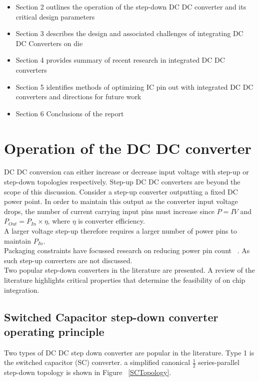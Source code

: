 \documentclass[letterpaper,twocolumn,10pt]{article}
\begin{document}
\begin{itemize}
\item{Section 2 outlines the operation of the step-down DC DC converter and its critical design parameters}
\item{Section 3 describes the design and associated challenges of integrating DC DC Converters on die}
\item{Section 4 provides summary of recent research in integrated DC DC converters}
\item{Section 5 identifies methods of optimizing IC pin out with integrated DC DC converters and directions for future work}
\item{Section 6 Conclusions of the report}
\end{itemize}
 


\section{Operation of the DC DC converter}

DC DC conversion can either increase or decrease input voltage with step-up or step-down topologies respectively. Step-up DC DC converters are beyond the scope of this discussion. Consider a step-up converter outputting a fixed DC power point. In order to maintain this output as the converter input voltage drops, the number of current carrying input pins must increase since $P = IV$ and $P_{Out} = P_{In}\times \eta$, where $\eta$ is converter efficiency.\\
A larger voltage step-up therefore requires a larger number of power pins to maintain $P_{In}$.\\ Packaging constraints have focussed research on reducing power pin count ~\cite{Marbell2011}. As such step-up converters are not discussed.\\
\indent Two popular step-down converters in the literature are presented. A review of the literature highlights critical properties that determine the feasibility of on chip integration.

\subsection{Switched Capacitor step-down converter operating principle}\label{SCOpPrinciple}
Two types of DC DC step down converter are popular in the literature. Type 1 is the switched capacitor (SC) converter. a simplified canonical $\frac{1}{2}$ series-parallel step-down topology is shown in Figure ~\ref{SCTopology}.\\
\end{document}
